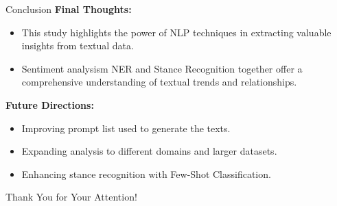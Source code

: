 \documentclass{beamer}
\begin{document}
\begin{frame}{Conclusion}
    \textbf{Final Thoughts:}
    \begin{itemize}
        \item This study highlights the power of NLP techniques in extracting valuable insights from textual data.
        \item Sentiment analysism NER and Stance Recognition together offer a comprehensive understanding of textual trends and relationships.
    \end{itemize}
    
    \textbf{Future Directions:}
    \begin{itemize}
        \item Improving prompt list used to generate the texts.
        \item Expanding analysis to different domains and larger datasets.
        \item Enhancing stance recognition with Few-Shot Classification.
    \end{itemize}
\end{frame}

\begin{frame}
    \centering
    \Huge{Thank You for Your Attention!}
\end{frame}
\end{document}
